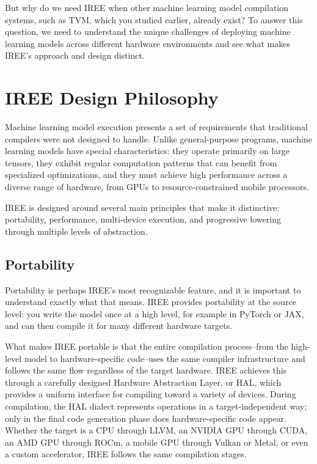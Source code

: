 \documentclass[11pt,a4paper]{article}
\begin{document}
But why do we need IREE when other machine learning model compilation systems, such as TVM, which you studied earlier, already exist? To answer this question, we need to understand the unique challenges of deploying machine learning models across different hardware environments and see what makes IREE's approach and design distinct.

\section{IREE Design Philosophy}

Machine learning model execution presents a set of requirements that traditional compilers were not designed to handle. Unlike general-purpose programs, machine learning models have special characteristics: they operate primarily on large tensors, they exhibit regular computation patterns that can benefit from specialized optimizations, and they must achieve high performance across a diverse range of hardware, from GPUs to resource-constrained mobile processors.

IREE is designed around several main principles that make it distinctive: portability, performance, multi-device execution, and progressive lowering through multiple levels of abstraction.

\subsection{Portability}

Portability is perhaps IREE's most recognizable feature, and it is important to understand exactly what that means. IREE provides portability at the source level: you write the model once at a high level, for example in PyTorch or JAX, and can then compile it for many different hardware targets.

What makes IREE portable is that the entire compilation process--from the high-level model to hardware-specific code--uses the same compiler infrastructure and follows the same flow regardless of the target hardware. IREE achieves this through a carefully designed Hardware Abstraction Layer, or HAL, which provides a uniform interface for compiling toward a variety of devices. During compilation, the HAL dialect represents operations in a target-independent way; only in the final code generation phase does hardware-specific code appear. Whether the target is a CPU through LLVM, an NVIDIA GPU through CUDA, an AMD GPU through ROCm, a mobile GPU through Vulkan or Metal, or even a custom accelerator, IREE follows the same compilation stages.
\end{document}
